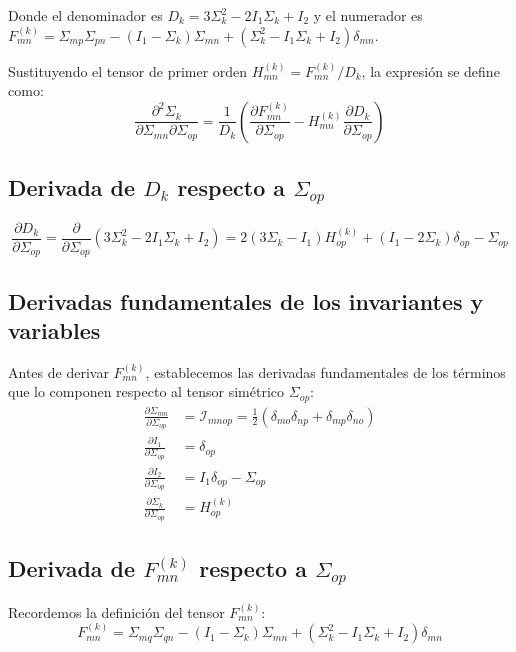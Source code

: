 \documentclass[12pt]{article}
\begin{document}
Donde el denominador es $D_k = 3\Sigma_k^2 - 2I_1\Sigma_k + I_2$ y el numerador es $F_{mn}^{(k)} = \Sigma_{mp}\Sigma_{pn} - (I_1 - \Sigma_k)\Sigma_{mn} + (\Sigma_k^2 - I_1\Sigma_k + I_2)\delta_{mn}$. 

Sustituyendo el tensor de primer orden $H_{mn}^{(k)} = F_{mn}^{(k)}/D_k$, la expresión se define como:
\begin{equation}
    \frac{\partial^2 \Sigma_k}{\partial \Sigma_{mn} \partial \Sigma_{op}} = \frac{1}{D_k} \left( \frac{\partial F_{mn}^{(k)}}{\partial \Sigma_{op}} - H_{mn}^{(k)} \frac{\partial D_k}{\partial \Sigma_{op}} \right)
\end{equation}

\subsection{Derivada de $D_k$ respecto a $\Sigma_{op}$}
\begin{equation}
    \frac{\partial D_k}{\partial \Sigma_{op}} = \frac{\partial}{\partial \Sigma_{op}} \left(3\Sigma_k^2 - 2I_1\Sigma_k + I_2\right) = 2(3\Sigma_k - I_1)H_{op}^{(k)} + (I_1 - 2\Sigma_k)\delta_{op} - \Sigma_{op}
\end{equation}




\subsection{Derivadas fundamentales de los invariantes y variables}
Antes de derivar $F_{mn}^{(k)}$, establecemos las derivadas fundamentales de los términos que lo componen respecto al tensor simétrico $\Sigma_{op}$:
\begin{align}
    \frac{\partial \Sigma_{mn}}{\partial \Sigma_{op}} &= \mathcal{I}_{mnop} = \frac{1}{2}(\delta_{mo}\delta_{np} + \delta_{mp}\delta_{no}) \\
    \frac{\partial I_1}{\partial \Sigma_{op}} &= \delta_{op} \\
    \frac{\partial I_2}{\partial \Sigma_{op}} &= I_1\delta_{op} - \Sigma_{op} \\
    \frac{\partial \Sigma_k}{\partial \Sigma_{op}} &= H_{op}^{(k)}
\end{align}

\subsection{Derivada de $F_{mn}^{(k)}$ respecto a $\Sigma_{op}$}
Recordemos la definición del tensor $F_{mn}^{(k)}$:
\begin{equation}
    F_{mn}^{(k)} = \Sigma_{mq}\Sigma_{qn} - (I_1 - \Sigma_k)\Sigma_{mn} + (\Sigma_k^2 - I_1\Sigma_k + I_2)\delta_{mn}
\end{equation}
\end{document}

